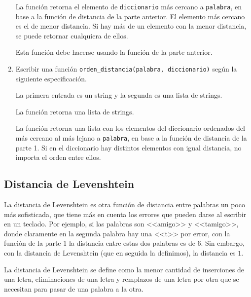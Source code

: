 \documentclass[a4paper,12pt]{book}
\theoremstyle{definition}
\begin{document}
\begin{enumerate}
		La función retorna el elemento de {\tt diccionario} más cercano a {\tt palabra}, en base a la función de distancia de la parte anterior. El elemento más cercano es el de menor distancia. Si hay más de un elemento con la menor distancia, se puede retornar cualquiera de ellos.
		
		Esta función debe hacerse usando la función de la parte anterior.
		
		\item Escribir una función {\tt orden\_distancia(palabra, diccionario)} según la siguiente especificación.
		
		La primera entrada es un string y la segunda es una lista de strings.
		
		La función retorna una lista de strings.
		
		La función retorna una lista con los elementos del diccionario ordenados del más cercano al más lejano a {\tt palabra}, en base a la función de distancia de la parte 1. Si en el diccionario hay distintos elementos con igual distancia, no importa el orden entre ellos.
	\end{enumerate}
	
	\subsection*{Distancia de Levenshtein}
	
	La distancia de Levenshtein es otra función de distancia entre palabras un poco más sofisticada, que tiene más en cuenta los errores que pueden darse al escribir en un teclado. Por ejemplo, si las palabras son <<amigo>> y <<tamigo>>, donde claramente en la segunda palabra hay una <<t>> por error, con la función de la parte 1 la distancia entre estas dos palabras es de $6$. Sin embargo, con la distancia de Levenshtein (que en seguida la definimos), la distancia es $1$.
	
	La distancia de Levenshtein se define como la menor cantidad de inserciones de una letra, eliminaciones de una letra y remplazos de una letra por otra que se necesitan para pasar de una palabra a la otra.
	
\end{document}
